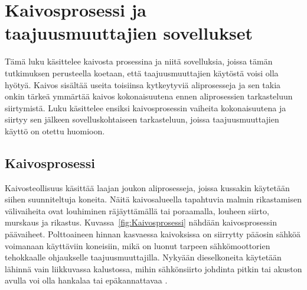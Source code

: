 \documentclass[finnish,12pt,a4paper,pdftex,elec,utf8]{aaltothesis}
\begin{document}






\clearpage


\section{Kaivosprosessi ja taajuusmuuttajien sovellukset}
Tämä luku käsittelee kaivosta prosessina ja niitä sovelluksia, joissa tämän tutkimuksen perusteella koetaan, että taajuusmuuttajien käytöstä voisi olla hyötyä. Kaivos sisältää useita toisiinsa kytkeytyviä aliprosesseja ja sen takia onkin tärkeä ymmärtää kaivos kokonaisuutena ennen aliprosessien tarkasteluun siirtymistä. Luku käsittelee ensiksi kaivosprosessin vaiheita kokonaisuutena ja siirtyy sen jälkeen sovelluskohtaiseen tarkasteluun, joissa taajuusmuuttajien käyttö on otettu huomioon.
\subsection{Kaivosprosessi}
Kaivosteollisuus käsittää laajan joukon aliprosesseja, joissa kussakin käytetään siihen suunniteltuja koneita. Näitä kaivosalueella tapahtuvia malmin rikastamisen välivaiheita ovat louhiminen räjäyttämällä tai poraamalla, louheen siirto, murskaus ja rikastus. Kuvassa~\ref{fig:Kaivosprosessi} nähdään kaivosprosessin päävaiheet. Polttoaineen hinnan kasvaessa kaivoksissa on siirrytty pääosin sähköä voimanaan käyttäviin koneisiin, mikä on luonut tarpeen sähkömoottorien tehokkaalle ohjaukselle taajuusmuuttajilla. Nykyään dieselkoneita käytetään lähinnä vain liikkuvassa kalustossa, mihin sähkönsiirto johdinta pitkin tai akuston avulla voi olla hankalaa tai epäkannattavaa \cite{MetsoHaastattelu}.
\\\\ 
\end{document}
